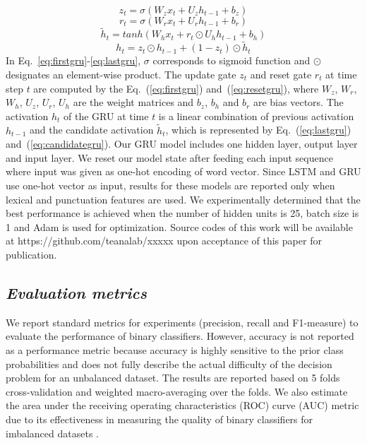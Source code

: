 \documentclass{amia}
\begin{document}
\begin{equation}
z_t = \sigma(W_zx_t + U_zh_{t-1} + b_z)
\label{eq:firstgru}
\end{equation}
\begin{equation}
r_t = \sigma(W_rx_t + U_rh_{t-1} + b_r)
\label{eq:resetgru}
\end{equation}
\begin{equation}
\tilde h_t = tanh(W_hx_t + r_t \odot U_hh_{t-1} + b_h) 
\label{eq:candidategru}
\end{equation}
\begin{equation}
h_t = z_t \odot h_{t-1} + (1-z_t) \odot \tilde h_t
\label{eq:lastgru}
\end{equation}  
In Eq.~\ref{eq:firstgru}-\ref{eq:lastgru}, $\sigma$ corresponds to sigmoid function and $\odot$ designates an element-wise product. The update gate $z_t$ and reset gate $r_t$ at time step $t$ are computed by the Eq.~(\ref{eq:firstgru}) and~(\ref{eq:resetgru}), where $W_z$, $W_r$, $W_h$, $U_z$, $U_r$, $U_h$ are the weight matrices and $b_z$, $b_h$ and $b_r$ are bias vectors. The activation $h_t$ of the GRU at time $t$ is a linear combination of previous activation $h_{t-1}$ and the candidate activation $\tilde h_t$, which is represented by Eq.~(\ref{eq:lastgru}) and~(\ref{eq:candidategru}). Our GRU model includes one hidden layer, output layer and input layer. We reset our model state after feeding each input sequence where input was given as one-hot encoding of word vector. Since LSTM and GRU use one-hot vector as input, results for these models are reported only when lexical and punctuation features are used. We experimentally determined that the best performance is achieved when the number of hidden units is 25, batch size is 1 and Adam\cite{kingma2014adam} is used for optimization. Source codes of this work will be available at https://github.com/teanalab/xxxxx upon acceptance of this paper for publication.          
  
\subsection*{\textit{Evaluation metrics}}
We report standard metrics for experiments (precision, recall and F1-measure) to evaluate the performance of binary classifiers\cite{aas1999text}. However, accuracy is not reported as a performance metric because accuracy is highly sensitive to the prior class probabilities and does not fully describe the actual difficulty of the decision problem for an unbalanced dataset. The results are reported based on 5 folds cross-validation and weighted macro-averaging over the folds. We also estimate the area under the receiving operating characteristics (ROC) curve\cite{kumar2011receiver} (AUC) metric due to its effectiveness in measuring the quality of binary classifiers for imbalanced datasets \cite{hu2015kernelized}. 
\end{document}
